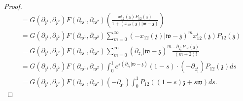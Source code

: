 \documentclass[11pt]{amsart}
\theoremstyle{definition}
\theoremstyle{remark}
\numberwithin{equation}{section}
\begin{document}
\begin{proof}
\begin{align*}
     & =G(\partial_{\mathfrak{z}^1},\partial_{\mathfrak{z}^2})F(\partial_{\mathfrak{w}^1},\partial_{\mathfrak{w}^2})\left(\frac{x^i_{12}(\mathfrak{z})P_{12}(\mathfrak{z})}{1+(x_{12}(\mathfrak{z})|\mathfrak{w}-\mathfrak{z})}\right)\\
    &=  G(\partial_{\mathfrak{z}^1},\partial_{\mathfrak{z}^2})F(\partial_{\mathfrak{w}^1},\partial_{\mathfrak{w}^2})  \sum_{m=0}^{\infty}(-x_{12}(\mathfrak{z})|\mathfrak{w}-\mathfrak{z})^mx^i_{12}(\mathfrak{z})P_{12}(\mathfrak{z}) \\
    &=G(\partial_{\mathfrak{z}^1},\partial_{\mathfrak{z}^2})F(\partial_{\mathfrak{w}^1},\partial_{\mathfrak{w}^2}) \sum_{m=0}^{\infty}(\partial_{z_1}|\mathfrak{w}-\mathfrak{z})^m\frac{-\partial_{z^1_1}P_{12}(\mathfrak{z})}{(m+2)!}\\
    &=G(\partial_{\mathfrak{z}^1},\partial_{\mathfrak{z}^2})F(\partial_{\mathfrak{w}^1},\partial_{\mathfrak{w}^2}) \int^1_0e^{s(\partial_{z_1}|\mathfrak{w}-\mathfrak{z})}(1-s)\cdot (-\partial_{z^{i}_1})P_{12}(\mathfrak{z})ds\\
    &=G(\partial_{\mathfrak{z}^1},\partial_{\mathfrak{z}^2})F(\partial_{\mathfrak{w}^1},\partial_{\mathfrak{w}^2})(-\partial_{\mathfrak{z}^i})\int^1_0P_{12}\left((1-s)\mathfrak{z}+s\mathfrak{w}\right)ds.
  \end{align*}
  \fi
\end{proof}
\end{document}
